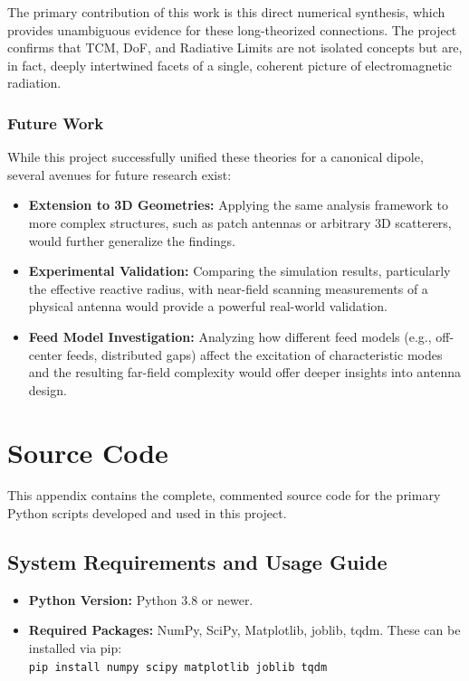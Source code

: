 \documentclass[11pt, a4paper]{report}
\begin{document}
The primary contribution of this work is this direct numerical synthesis, which provides unambiguous evidence for these long-theorized connections. The project confirms that TCM, DoF, and Radiative Limits are not isolated concepts but are, in fact, deeply intertwined facets of a single, coherent picture of electromagnetic radiation.

\subsection{Future Work}
While this project successfully unified these theories for a canonical dipole, several avenues for future research exist:
\begin{itemize}
    \item \textbf{Extension to 3D Geometries:} Applying the same analysis framework to more complex structures, such as patch antennas or arbitrary 3D scatterers, would further generalize the findings.
    \item \textbf{Experimental Validation:} Comparing the simulation results, particularly the effective reactive radius, with near-field scanning measurements of a physical antenna would provide a powerful real-world validation.
    \item \textbf{Feed Model Investigation:} Analyzing how different feed models (e.g., off-center feeds, distributed gaps) affect the excitation of characteristic modes and the resulting far-field complexity would offer deeper insights into antenna design.
\end{itemize}

\newpage

\appendix

\chapter{Source Code} \label{app:code}
This appendix contains the complete, commented source code for the primary Python scripts developed and used in this project.

\section{System Requirements and Usage Guide}
\begin{itemize}
    \item \textbf{Python Version:} Python 3.8 or newer.
    \item \textbf{Required Packages:} NumPy, SciPy, Matplotlib, joblib, tqdm. These can be installed via pip: \\
    \texttt{pip install numpy scipy matplotlib joblib tqdm}
\end{itemize}
\end{document}
